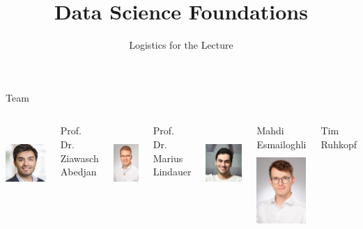\documentclass[aspectratio=169]{../latex_main/tntbeamer}  %
\title[Introduction]{Data Science Foundations}
\subtitle{Logistics for the Lecture}
\begin{document}
	
	\maketitle

\begin{frame}[c]{Team}

\begin{columns}[T]



\centering
\includegraphics[height=8em]{./figures/zia}

Prof. Dr.\\ Ziawasch Abedjan

\centering
\includegraphics[height=8em]{./figures/Lindauer_Marius_004small.jpg}

Prof. Dr.\\ Marius Lindauer

\centering
\includegraphics[height=8em]{./figures/mahdi}

Mahdi Esmailoghli\\

\centering
\includegraphics[height=8em]{./figures/tim}

Tim Ruhkopf\\

\end{columns}

\end{frame}
\end{document}
